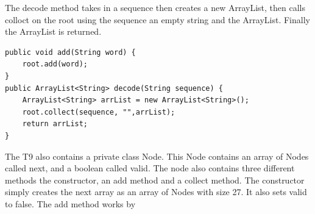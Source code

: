 \documentclass[a4paper,11pt]{article}
\begin{document}
The decode method takes in a sequence then creates a new ArrayList, then calls colloct on the root using the sequence an empty string and the ArrayList. Finally the ArrayList is returned.
\begin{verbatim}
public void add(String word) {
    root.add(word);
}
public ArrayList<String> decode(String sequence) {
    ArrayList<String> arrList = new ArrayList<String>();
    root.collect(sequence, "",arrList);
    return arrList;
}
\end{verbatim}
The T9 also contains a private class Node. This Node contains an array of Nodes called next, and a boolean called valid.
The node also contains three different methods the constructor, an add method and a collect method. 
The constructor simply creates the next array as an array of Nodes with size 27. It also sets valid to false.
\newline
The add method works by
\end{document}
